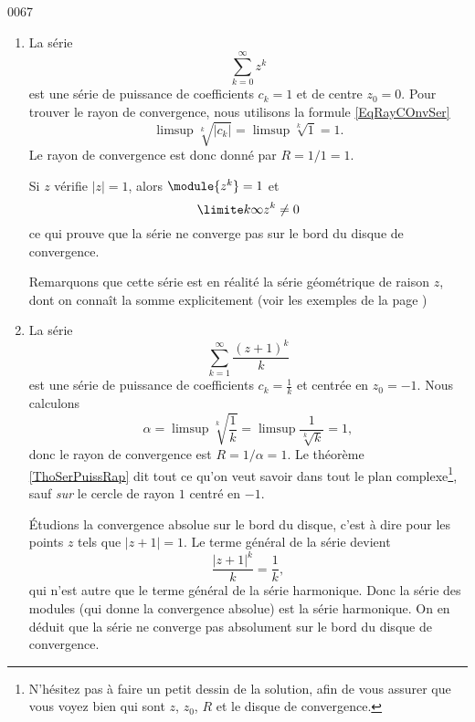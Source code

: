 
\begin{corrige}{0067}

\begin{enumerate}
\item La série
\begin{equation*}
	\sum_{k=0}^\infty z^k
\end{equation*}
est une série de puissance de coefficients $c_k = 1$ et de centre $z_0 = 0$. Pour trouver le rayon de convergence, nous utilisons la formule \eqref{EqRayCOnvSer}
\begin{equation*}
	\limsup\sqrt[k]{| c_k |}=\limsup\sqrt[k]{1}=1.
\end{equation*}
Le rayon de convergence est donc donné par $R = 1/1 = 1$.

Si $z$ vérifie $| z | = 1$, alors $\module{z^k} = 1$ et
\begin{equation*}
	\limite k \infty z^k \neq 0
\end{equation*}
ce qui prouve que la série ne converge pas sur le bord du disque de
convergence.

Remarquons que cette série est en réalité la série géométrique de raison $z$, dont on connaît la somme explicitement (voir les exemples de la page \pageref{exemplesseries})

\item La série
\begin{equation*}
	\sum_{k=1}^\infty \frac{{(z+1)}^k}{k}
\end{equation*}
est une série de puissance de coefficients $c_k = \frac{1}{ k }$ et centrée en $z_0 = -1$. Nous calculons
\begin{equation}
	\alpha=\limsup\sqrt[k]{\frac{1}{ k }}=\limsup\frac{1}{ \sqrt[k]{k} }=1,
\end{equation}
donc le rayon de convergence est $R = 1/\alpha = 1$. Le théorème \ref{ThoSerPuissRap} dit tout ce qu'on veut savoir dans tout le plan complexe\footnote{N'hésitez pas à faire un petit dessin de la solution, afin de vous assurer que vous voyez bien qui sont $z$, $z_0$, $R$ et le disque de convergence.}, sauf \emph{sur} le cercle de rayon $1$ centré en $-1$.


Étudions la convergence absolue sur le bord du disque, c'est à dire pour les points $z$ tels que $| z+1 |=1$. Le terme général de la série devient
\begin{equation}
	\frac{ | z+1 |^k }{ k }=\frac{ 1 }{ k },
\end{equation}
qui n'est autre que le terme général de la série harmonique. Donc la série des modules (qui donne la convergence absolue) est la série harmonique. On en déduit que la série ne converge pas absolument sur le bord du disque de convergence.


\end{enumerate}
\end{corrige}
